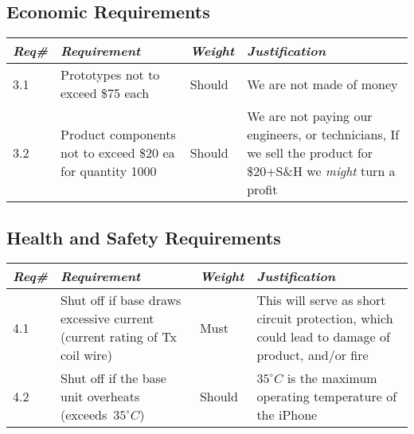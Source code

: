 \newpage
{}  %


    \subsection{Economic Requirements}
        \begin{centering}
        \begin{tabular}{|l|m{7cm}|l|m{7cm}|} \hline
        \textit{\textbf{Req\#}}	& \textit{\textbf{Requirement}} &\textit{\textbf{Weight}}&\textit{\textbf{Justification}} \\ \hline
        3.1 & Prototypes not to exceed \$75 each & Should & We are not made of money  \\ \hline
        3.2 & Product components not to exceed \$20 ea for quantity 1000 & Should & We are not paying our engineers, or technicians, If we sell the product for \$20+S\&H we \textit{might} turn a profit \\ \hline
        \end{tabular}
        \end{centering}    
        

    \subsection{Health and Safety Requirements}
        \begin{centering}
        \begin{tabular}{|l|m{7cm}|l|m{7cm}|} \hline
        \textit{\textbf{Req\#}}	& \textit{\textbf{Requirement}} &\textit{\textbf{Weight}}&\textit{\textbf{Justification}} \\ \hline
        4.1	& Shut off if base draws excessive current (current rating of Tx coil wire)	& Must &This will serve as short circuit protection, which could lead to damage of product, and/or fire \\ \hline
        4.2	& Shut off if the base unit overheats \mbox{(exceeds $35^{\circ}C$)} \cite{appletemp} & Should & $35^{\circ}C$ is the maximum operating temperature of the iPhone \\ \hline
        \end{tabular}
        \end{centering}
    
